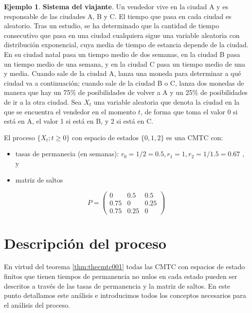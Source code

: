 \documentclass[
]{book}
\providecommand{\tightlist}{%
  \setlength{\itemsep}{0pt}\setlength{\parskip}{0pt}}
\theoremstyle{definition}
\theoremstyle{definition}
\newtheorem{example}{Ejemplo}[chapter]
\theoremstyle{definition}
\theoremstyle{definition}
\theoremstyle{remark}
\begin{document}
\begin{example}
\protect\hypertarget{exm:excmtc002}{}\label{exm:excmtc002}\textbf{Sistema del viajante}. Un vendedor vive en la ciudad A y es responsable de las ciudades A, B y C. El tiempo que pasa en cada ciudad es aleatorio. Tras un estudio, se ha determinado que la cantidad de tiempo consecutivo que pasa en una ciudad cualquiera sigue una variable aleatoria con distribución exponencial, cuya media de tiempo de estancia depende de la ciudad. En su ciudad natal pasa un tiempo medio de dos semanas, en la ciudad B pasa un tiempo medio de una semana, y en la ciudad C pasa un tiempo medio de una y media. Cuando sale de la ciudad A, lanza una moneda para determinar a qué ciudad va a continuación; cuando sale de la ciudad B o C, lanza dos monedas de manera que hay un 75\% de posibilidades de volver a A y un 25\% de posibilidades de ir a la otra ciudad. Sea \(X_t\) una variable aleatoria que denota la ciudad en la que se encuentra el vendedor en el momento \(t\), de forma que toma el valor 0 si está en A, el valor 1 si está en B, y 2 si está en C.
\end{example}

El proceso \(\{X_t; t \geq 0\}\) con espacio de estados \(\{0, 1, 2\}\) es una CMTC con:

\begin{itemize}
\tightlist
\item
  tasas de permanecia (en semanas): \(r_0 = 1/2=0.5, r_1 = 1, r_2 = 1/1.5 =0.67\) , y
\item
  matriz de saltos
\end{itemize}

\[P = 
\begin{pmatrix}
0 & 0.5 & 0.5\\
0.75 & 0 & 0.25\\
0.75 & 0.25 & 0
\end{pmatrix}\]

\hypertarget{CMTCB}{%
\section{Descripción del proceso}\label{CMTCB}}

En virtud del teorema \ref{thm:thecmtc001} todas las CMTC con espacios de estado finitos que tienen tiempos de permanencia no nulos en cada estado pueden ser descritos a través de las tasas de permanencia y la matriz de saltos. En este punto detallamos este análisis e introducimos todos los conceptos necesarios para el análisis del proceso.
\end{document}
